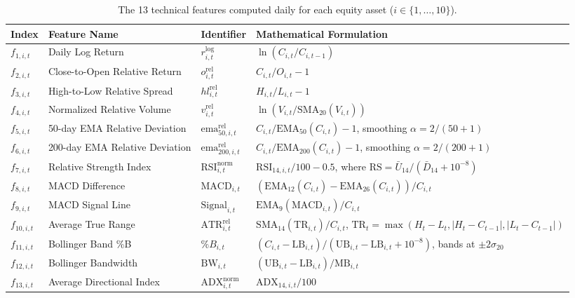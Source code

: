 \documentclass[11pt,a4paper]{article}
\numberwithin{equation}{section}
\numberwithin{table}{section}
\numberwithin{figure}{section}
\numberwithin{algorithm}{section}
\begin{document}
\begin{table}[!htbp]
\centering\footnotesize
\caption{The 13 technical features computed daily for each equity asset ($i\in\{1,\dots,10\}$).}\label{tab:features}
\setlength{\tabcolsep}{4pt}
\begin{tabular}{@{}p{1.1cm}p{3.3cm}p{2.5cm}p{8.6cm}@{}}
\toprule
Index & Feature Name & Identifier & Mathematical Formulation\\
\midrule
$f_{1,i,t}$ & Daily Log Return & $r^{\log}_{i,t}$ & $\ln(C_{i,t}/C_{i,t-1})$\\
$f_{2,i,t}$ & Close-to-Open Relative Return & $o^{\mathrm{rel}}_{i,t}$ & $C_{i,t}/O_{i,t}-1$\\
$f_{3,i,t}$ & High-to-Low Relative Spread & $hl^{\mathrm{rel}}_{i,t}$ & $H_{i,t}/L_{i,t}-1$\\
$f_{4,i,t}$ & Normalized Relative Volume & $v^{\mathrm{rel}}_{i,t}$ & $\ln(V_{i,t}/\mathrm{SMA}_{20}(V_{i,t}))$\\
$f_{5,i,t}$ & 50-day EMA Relative Deviation & $\mathrm{ema}^{\mathrm{rel}}_{50,i,t}$ & $C_{i,t}/\mathrm{EMA}_{50}(C_{i,t})-1$, smoothing $\alpha=2/(50+1)$ \cite{wang2025}\\
$f_{6,i,t}$ & 200-day EMA Relative Deviation & $\mathrm{ema}^{\mathrm{rel}}_{200,i,t}$ & $C_{i,t}/\mathrm{EMA}_{200}(C_{i,t})-1$, smoothing $\alpha=2/(200+1)$ \cite{wang2025}\\
$f_{7,i,t}$ & Relative Strength Index & $\mathrm{RSI}^{\mathrm{norm}}_{i,t}$ & $\mathrm{RSI}_{14,i,t}/100-0.5$, where $\mathrm{RS}=\bar U_{14}/(\bar D_{14}+10^{-8})$ \cite{wang2025}\\
$f_{8,i,t}$ & MACD Difference & $\mathrm{MACD}_{i,t}$ & $(\mathrm{EMA}_{12}(C_{i,t})-\mathrm{EMA}_{26}(C_{i,t}))/C_{i,t}$ \cite{wang2025}\\
$f_{9,i,t}$ & MACD Signal Line & $\mathrm{Signal}_{i,t}$ & $\mathrm{EMA}_{9}(\mathrm{MACD}_{i,t})/C_{i,t}$ \cite{wang2025}\\
$f_{10,i,t}$ & Average True Range & $\mathrm{ATR}^{\mathrm{rel}}_{i,t}$ & $\mathrm{SMA}_{14}(\mathrm{TR}_{i,t})/C_{i,t}$, $\mathrm{TR}_t=\max(H_t-L_t,|H_t-C_{t-1}|,|L_t-C_{t-1}|)$ \cite{wang2025}\\
$f_{11,i,t}$ & Bollinger Band \%B & $\%B_{i,t}$ & $(C_{i,t}-\mathrm{LB}_{i,t})/(\mathrm{UB}_{i,t}-\mathrm{LB}_{i,t}+10^{-8})$, bands at $\pm2\sigma_{20}$ \cite{wang2025}\\
$f_{12,i,t}$ & Bollinger Bandwidth & $\mathrm{BW}_{i,t}$ & $(\mathrm{UB}_{i,t}-\mathrm{LB}_{i,t})/\mathrm{MB}_{i,t}$ \cite{wang2025}\\
$f_{13,i,t}$ & Average Directional Index & $\mathrm{ADX}^{\mathrm{norm}}_{i,t}$ & $\mathrm{ADX}_{14,i,t}/100$\\
\bottomrule
\end{tabular}
\end{table}
\end{document}
